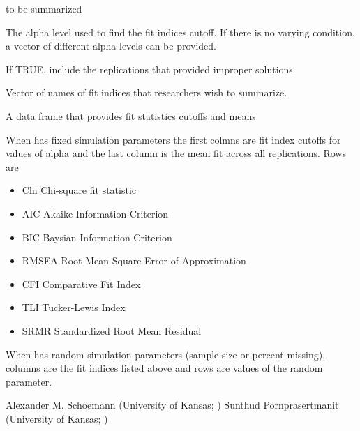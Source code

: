 \documentclass[a4paper]{book}
\begin{document}
\begin{Arguments}
\begin{ldescription}
\item[\code{object}] 
 to be summarized

\item[\code{alpha}] 
The alpha level used to find the fit indices cutoff. If there is no varying condition, a vector of different alpha levels can be provided.

\item[\code{improper}] 
If TRUE, include the replications that provided improper solutions

\item[\code{usedFit}] 
Vector of names of fit indices that researchers wish to summarize. 

\end{ldescription}
\end{Arguments}
%
\begin{Value}
A data frame that provides fit statistics cutoffs and means

When  has fixed simulation parameters the first colmns are fit index cutoffs for values of alpha and the last column is the mean fit across all replications. Rows are
\begin{itemize}

\item Chi Chi-square fit statistic
\item AIC Akaike Information Criterion
\item BIC Baysian Information Criterion
\item RMSEA Root Mean Square Error of Approximation
\item CFI Comparative Fit Index
\item TLI Tucker-Lewis Index
\item SRMR Standardized Root Mean Residual

\end{itemize}

When  has random simulation parameters (sample size or percent missing), columns are the fit indices listed above and rows are values of the random parameter.
\end{Value}
%
\begin{Author}\relax
Alexander M. Schoemann (University of Kansas; )
Sunthud Pornprasertmanit (University of Kansas; )
\end{Author}
\end{document}
